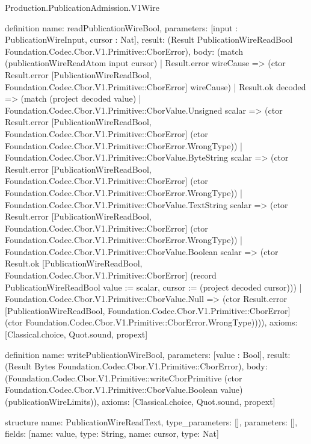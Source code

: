 \begin{lexlean}{Production.PublicationAdmission.V1Wire}
\begin{semanticmodule}
definition{
  name: readPublicationWireBool,
  parameters: [input : PublicationWireInput, cursor : Nat],
  result: (Result PublicationWireReadBool Foundation.Codec.Cbor.V1.Primitive::CborError),
  body: (match (publicationWireReadAtom input cursor)
    | Result.error wireCause => (ctor Result.error [PublicationWireReadBool, Foundation.Codec.Cbor.V1.Primitive::CborError] wireCause)
    | Result.ok decoded => (match (project decoded value)
      | Foundation.Codec.Cbor.V1.Primitive::CborValue.Unsigned scalar => (ctor Result.error [PublicationWireReadBool, Foundation.Codec.Cbor.V1.Primitive::CborError] (ctor Foundation.Codec.Cbor.V1.Primitive::CborError.WrongType))
      | Foundation.Codec.Cbor.V1.Primitive::CborValue.ByteString scalar => (ctor Result.error [PublicationWireReadBool, Foundation.Codec.Cbor.V1.Primitive::CborError] (ctor Foundation.Codec.Cbor.V1.Primitive::CborError.WrongType))
      | Foundation.Codec.Cbor.V1.Primitive::CborValue.TextString scalar => (ctor Result.error [PublicationWireReadBool, Foundation.Codec.Cbor.V1.Primitive::CborError] (ctor Foundation.Codec.Cbor.V1.Primitive::CborError.WrongType))
      | Foundation.Codec.Cbor.V1.Primitive::CborValue.Boolean scalar => (ctor Result.ok [PublicationWireReadBool, Foundation.Codec.Cbor.V1.Primitive::CborError] (record PublicationWireReadBool {value := scalar, cursor := (project decoded cursor)}))
      | Foundation.Codec.Cbor.V1.Primitive::CborValue.Null => (ctor Result.error [PublicationWireReadBool, Foundation.Codec.Cbor.V1.Primitive::CborError] (ctor Foundation.Codec.Cbor.V1.Primitive::CborError.WrongType)))),
  axioms: [Classical.choice, Quot.sound, propext]
}

definition{
  name: writePublicationWireBool,
  parameters: [value : Bool],
  result: (Result Bytes Foundation.Codec.Cbor.V1.Primitive::CborError),
  body: (Foundation.Codec.Cbor.V1.Primitive::writeCborPrimitive (ctor Foundation.Codec.Cbor.V1.Primitive::CborValue.Boolean value) (publicationWireLimits)),
  axioms: [Classical.choice, Quot.sound, propext]
}

structure{
  name: PublicationWireReadText,
  type_parameters: [],
  parameters: [],
  fields: [{name: value, type: String}, {name: cursor, type: Nat}]
}


\end{semanticmodule}
\end{lexlean}
